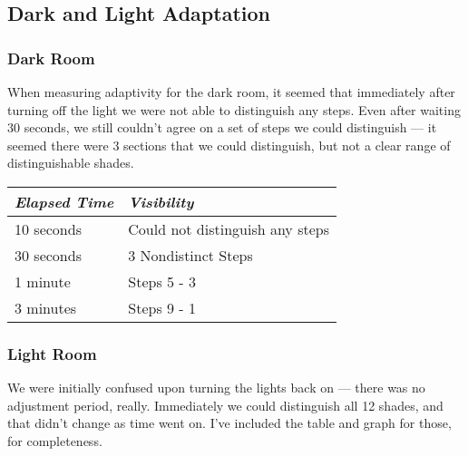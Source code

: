 \documentclass{article}
\begin{document}
\subsection{Dark and Light Adaptation}
\subsubsection{Dark Room}
When measuring adaptivity for the dark room, it seemed that immediately after turning off the light we were not able to distinguish any steps. Even after waiting 30 seconds, we still couldn't agree on a set of steps we could distinguish --- it seemed there were 3 sections that we could distinguish, but not a clear range of distinguishable shades.

\begin{table}[ht]
    \begin{tabular}{|l|l|}
    \hline
    \emph{Elapsed Time} & \emph{Visibility}        \\ \hline
    10 seconds   & Could not distinguish any steps \\ \hline
    30 seconds   & 3 Nondistinct Steps             \\ \hline
    1 minute     & Steps 5 - 3                     \\ \hline
    3 minutes    & Steps 9 - 1                     \\ \hline
    \end{tabular}
\end{table}

 \darktable

\begin{center}
\end{center}

\pagebreak

\subsubsection{Light Room}
We were initially confused upon turning the lights back on --- there was no adjustment period, really. Immediately we could distinguish all 12 shades, and that didn't change as time went on. I've included the table and graph for those, for completeness.
\end{document}
